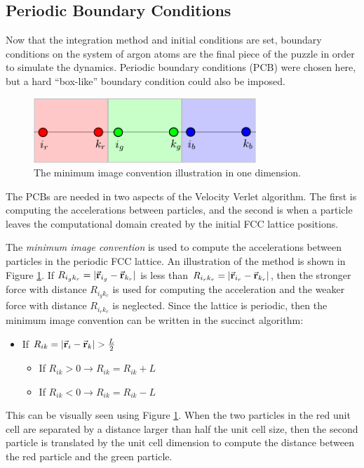 \documentclass[12pt,oneside,a4paper]{article}
\newcommand{\br}{\vec {\bf r}}
\begin{document}
\subsection{Periodic Boundary Conditions}

Now that the integration method and initial conditions are set, boundary conditions on the system of argon atoms are the final piece of the puzzle in order to simulate the dynamics.  Periodic boundary conditions (PCB) were chosen here, but a hard ``box-like'' boundary condition could also be imposed.  
\begin{figure}[!h]
	\centering
	\includegraphics[width=0.75\textwidth]{./minimum-image-convention.pdf}
	\caption{The minimum image convention illustration in one dimension.}
	\label{fig:mic}
\end{figure} 
The PCBs are needed in two aspects of the Velocity Verlet algorithm.  The first is computing the accelerations between particles, and the second is when a particle leaves the computational domain created by the initial FCC lattice positions.

The \emph{minimum image convention} is used to compute the accelerations between particles in the periodic FCC lattice.  An illustration of the method is shown in Figure \ref{fig:mic}.  If $R_{i_g k_r} = |\br_{i_g} - \br_{k_r}|$ is less than $R_{i_r k_r} = |\br_{i_r} - \br_{k_r}|$, then the stronger force with distance  $R_{i_g k_r}$ is used for computing the acceleration and the weaker force with distance $R_{i_r k_r}$ is neglected.  Since the lattice is periodic, then the minimum image convention can be written in the succinct algorithm:
\begin{itemize}
	\item If $R_{i k} = |\br_{i} - \br_{k}| > \frac{L}{2}$
	\begin{itemize}
		\item If $R_{i k} > 0 \rightarrow R_{i k} = R_{i k} + L$
		\item If $R_{i k} < 0 \rightarrow R_{i k} = R_{i k} - L$
	\end{itemize}
\end{itemize}
This can be visually seen  using Figure \ref{fig:mic}.  When the two particles in the red unit cell are separated by a distance larger than half the unit cell size, then the second particle is translated by the unit cell dimension to compute the distance between the red particle and the green particle. 
\end{document}
